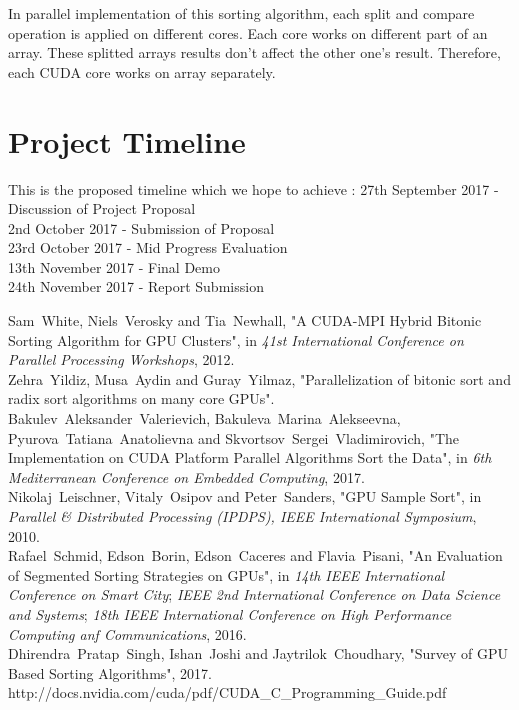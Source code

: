 \documentclass[conference]{IEEEtran}
\begin{document}
In parallel implementation of this sorting algorithm, each
split and compare operation is applied on different cores. Each
core works on different part of an array. These splitted arrays
results don't affect the other one's result. Therefore, each
CUDA core works on array separately.

\section{Project Timeline }
This is the proposed timeline which we hope to achieve : 
27th September 2017 - Discussion of Project Proposal\\
2nd October 2017 - Submission of Proposal\\
23rd October 2017 - Mid Progress Evaluation\\
13th November 2017 - Final Demo\\
24th November 2017 - Report Submission\\

\begin{thebibliography}{1}

Sam~White, Niels~Verosky and Tia~Newhall, "A CUDA-MPI Hybrid Bitonic Sorting Algorithm for GPU Clusters", in \emph{41st International Conference on Parallel Processing Workshops}, 2012.
\\
Zehra~Yildiz, Musa~Aydin and Guray~Yilmaz, "Parallelization of bitonic sort and radix sort algorithms on many core GPUs".
\\
Bakulev~Aleksander~Valerievich, Bakuleva~Marina~Alekseevna, Pyurova~Tatiana~Anatolievna and Skvortsov~Sergei~Vladimirovich, "The Implementation on CUDA Platform Parallel
Algorithms Sort the Data", in \emph{6th Mediterranean Conference on Embedded Computing}, 2017.
\\
Nikolaj~Leischner, Vitaly~Osipov and Peter~Sanders, "GPU Sample Sort", in \emph{Parallel \& Distributed Processing (IPDPS), IEEE
International Symposium}, 2010.
\\
Rafael~Schmid, Edson~Borin, Edson~Caceres and Flavia~Pisani, "An Evaluation of Segmented Sorting Strategies on GPUs", in \emph{14th IEEE International Conference on Smart City}; \emph{IEEE 2nd International Conference on Data Science and Systems}; \emph{18th IEEE International Conference on High Performance Computing anf Communications}, 2016.
\\
Dhirendra~Pratap~Singh, Ishan~Joshi and Jaytrilok~Choudhary, "Survey of GPU Based Sorting Algorithms", 2017.
\\
http://docs.nvidia.com/cuda/pdf/CUDA\_C\_Programming\_Guide.pdf

\end{thebibliography}
\end{document}
